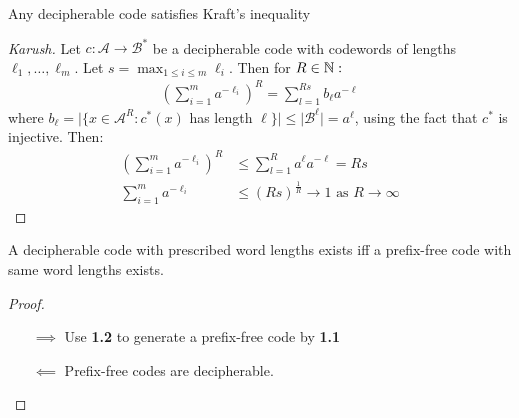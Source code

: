 \documentclass[10pt,a4paper]{article}
\begin{document}
\begin{theorem}[McMillan]
Any decipherable code satisfies Kraft's inequality
\end{theorem}
\begin{proof}[Karush]
Let $c:\mathcal{A} \to \mathcal{B}^{\ast}$ be a decipherable code with codewords of lengths $\ell_1, \ldots, \ell_m$. Let $s = \max_{1 \leq i\leq m} \ell_i$. Then for $R \in \mathbb{N}:$
\begin{align*}
\left(\sum_{i=1}^{m} a^{-\ell_i}\right)^R = \sum_{l=1}^{Rs} b_{\ell}a^{-\ell}
\end{align*}
where $b_{\ell} = |\{x \in \mathcal{A}^R : c^{\ast}(x)$ has length $\ell\}| \leq |\mathcal{B}^{\ell}| = a^{\ell}$, using the fact that $c^{\ast}$ is injective. Then:
\begin{align*}
\left(\sum_{i=1}^m a^{-\ell_i}\right)^R &\leq \sum_{l=1}^R a^\ell a^{-\ell} = Rs\\
\sum_{i=1}^m a^{-\ell_i} &\leq (Rs)^{\frac1R} \to 1 \text{ as } R \to \infty
\end{align*}
\end{proof}

\begin{corollary}
A decipherable code with prescribed word lengths exists iff a prefix-free code with same word lengths exists.
\end{corollary}
\begin{proof}
\item
\begin{itemize}
\item[$\implies$] Use \textbf{1.2} to generate a prefix-free code by \textbf{1.1}
\item[$\impliedby$] Prefix-free codes are decipherable.
\end{itemize}
\end{proof}
\end{document}
